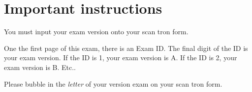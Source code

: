 \section*{Important instructions}

You must input your exam version onto your scan tron form.

One the first page of this exam, there is an Exam ID.
The final digit of the ID is your exam version.
If the ID is 1, your exam version is A.
If the ID is 2, your exam version is B.
Etc..

Please bubble in the \textit{letter} of your version exam on your scan tron form.

\newpage
